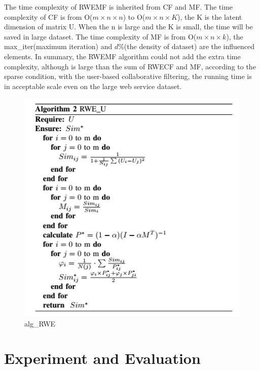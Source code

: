 \documentclass[conference]{IEEEtran}
\begin{document}
\par The time complexity of RWEMF is inherited from CF and MF. The time complexity of CF is from O($m \times n \times n$) to O($m \times n \times K$), the K is the latent dimension of matrix U. When the n is large and the K is small, the time will be saved in large dataset. The time complexity of MF is from O($m \times n \times k$), the max\_iter(maximum iteration) and $d \%$(the density of dataset) are the influenced elements. In summary, the RWEMF algorithm could not add the extra time complexity, although is large than the sum of RWECF and MF, according to the sparse condition, with the user-based collaborative filtering, the running time\cite{wang_collaborative_2015} is in acceptable scale even on the large web service dataset.

\begin{figure}[H] 
\centering  
\includegraphics[width=0.45\paperwidth]{alg2.png}  
\caption{alg_RWE}  
\label{alg_RWE}  
\end{figure} 

\section{Experiment and Evaluation}\label{S-EE}
\end{document}
